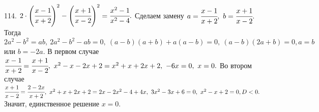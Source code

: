 114. $2\cdot\left(\cfrac{x-1}{x+2}\right)^2-\left(\cfrac{x+1}{x-2}\right)^2=\cfrac{x^2-1}{x^2-4}.$ Сделаем замену $a=\cfrac{x-1}{x+2},\ b=\cfrac{x+1}{x-2}.$ Тогда $2a^2-b^2=ab,\ 2a^2-b^2-ab=0,\ (a-b)(a+b)+a(a-b)=0,\ (a-b)(2a+b)=0, a=b$ или $b=-2a.$ В первом случае $\cfrac{x-1}{x+2}=\cfrac{x+1}{x-2},\ x^2-x-2x+2=x^2+x+2x+2,\ -6x=0,\ x=0.$ Во втором случае $\cfrac{x+1}{x-2}=\cfrac{2-2x}{x+2},\ x^2+x+2x+2=2x-2x^2-4+4x,\ 3x^2-3x+6=0,\ x^2-x+2=0, D<0.$ Значит, единственное решение $x=0.$\\
